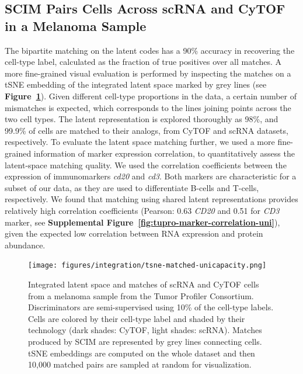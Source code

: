 \subsection{SCIM Pairs Cells Across scRNA and CyTOF in a Melanoma Sample}
The bipartite matching on the latent codes has a 90\% accuracy in recovering the cell-type label, calculated as the fraction of true positives over all matches.
A more fine-grained visual evaluation is performed by inspecting the matches on a tSNE embedding of the integrated latent space marked by grey lines (see \textbf{Figure~\ref{fig:tupro-tsne-uni}}).
Given different cell-type proportions in the data, a certain number of mismatches is expected, which corresponds to the lines joining points across the two cell types.
The latent representation is explored thoroughly as 98\%, and 99.9\% of cells are matched to their analogs, from CyTOF and scRNA datasets, respectively.
To evaluate the latent space matching further, we used a more fine-grained information of marker expression correlation, to quantitatively assess the latent-space matching quality.
We used the correlation coefficients between the expression of immunomarkers \textit{cd20} and \textit{cd3}.
Both markers are characteristic for a subset of our data, as they are used to differentiate B-cells and T-cells, respectively.
We found that matching using shared latent representations provides relatively high correlation coefficients
(Pearson: 0.63 \textit{CD20} and 0.51 for \textit{CD3} marker, see \textbf{Supplemental Figure~\ref{fig:tupro-marker-correlation-uni}}),
given the expected low correlation between RNA expression and protein abundance.

\begin{figure}[htbp]
    \centering
    \texttt{[image: figures/integration/tsne-matched-unicapacity.png]}
    \caption{
    Integrated latent space and matches of scRNA and CyTOF cells from a melanoma sample from the Tumor Profiler Consortium.
    Discriminators are semi-supervised using 10\% of the cell-type labels.
    Cells are colored by their cell-type label and shaded by their technology (dark shades: CyTOF, light shades: scRNA).
    Matches produced by SCIM are represented by grey lines connecting cells.
    tSNE embeddings \cite{maaten2008} are computed on the whole dataset and then 10,000 matched pairs are sampled at random for visualization.}
    \label{fig:tupro-tsne-uni}
\end{figure}


